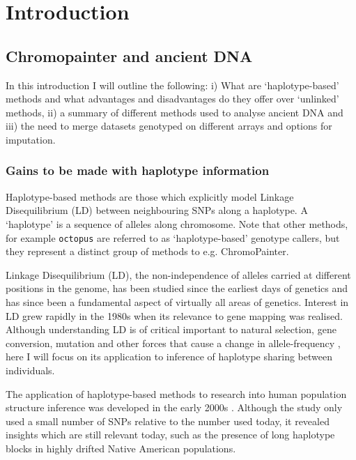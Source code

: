 \chapter{Introduction}

\section{Chromopainter and ancient DNA}

In this introduction I will outline the following: i) What are `haplotype-based' methods and what advantages and disadvantages do they offer over `unlinked' methods, ii) a summary of different methods used to analyse ancient DNA and iii) the need to merge datasets genotyped on different arrays and options for imputation. 

\subsection{Gains to be made with haplotype information}

Haplotype-based methods are those which explicitly model Linkage Disequilibrium (LD) between neighbouring SNPs along a haplotype. A `haplotype' is a sequence of alleles along chromosome. Note that other methods, for example \texttt{octopus} \cite{octopus} are referred to as `haplotype-based' genotype callers, but they represent a distinct group of methods to e.g. ChromoPainter.  

Linkage Disequilibrium (LD), the non-independence of alleles carried at different positions in the genome, has been studied since the earliest days of genetics \cite{morgan1912complete, bateson1902experiments} and has since been a fundamental aspect of virtually all areas of genetics. Interest in LD grew rapidly in the 1980s when its relevance to gene mapping was realised. Although understanding LD is of critical important to natural selection, gene conversion, mutation and other forces that cause a change in allele-frequency \cite{slatkin2008linkage}, here I will focus on its application to inference of haplotype sharing between individuals. 

The application of haplotype-based methods to research into human population structure inference was developed in the early 2000s \cite{conrad2006worldwide}. Although the study only used a small number of SNPs relative to the number used today, it revealed insights which are still relevant today, such as the presence of long haplotype blocks in highly drifted Native American populations. 
 
